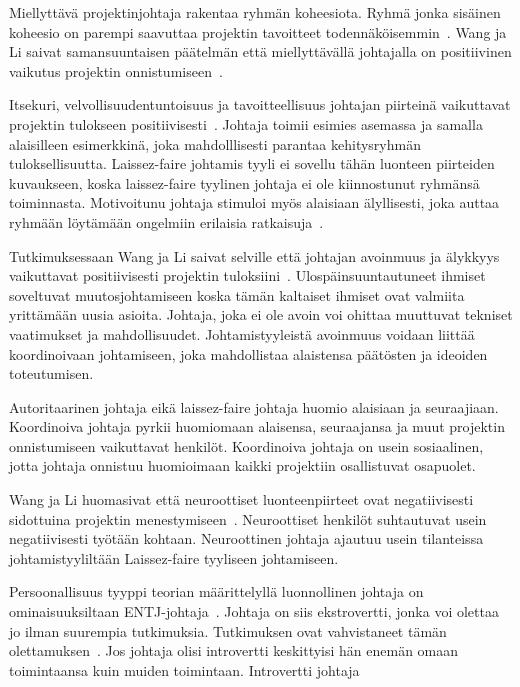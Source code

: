\documentclass[finnish]{tktltiki2}
\theoremstyle{definition}
\theoremstyle{remark}
\begin{document}
Miellyttävä projektinjohtaja rakentaa ryhmän koheesiota. Ryhmä jonka sisäinen koheesio on parempi saavuttaa projektin tavoitteet todennäköisemmin~\cite{bahli2005group}. Wang ja Li saivat samansuuntaisen päätelmän että miellyttävällä johtajalla on positiivinen vaikutus projektin onnistumiseen~\cite{Wang:2009:PMP:1639950.1640049}.

Itsekuri, velvollisuudentuntoisuus ja tavoitteellisuus johtajan piirteinä vaikuttavat projektin tulokseen positiivisesti~\cite{Wang:2009:PMP:1639950.1640049}. Johtaja toimii esimies asemassa ja samalla alaisilleen esimerkkinä, joka mahdolllisesti parantaa kehitysryhmän tuloksellisuutta. Laissez-faire johtamis tyyli ei sovellu tähän luonteen piirteiden kuvaukseen, koska laissez-faire tyylinen johtaja ei ole kiinnostunut ryhmänsä toiminnasta. Motivoitunu johtaja stimuloi myös alaisiaan älyllisesti, joka auttaa ryhmään löytämään ongelmiin erilaisia ratkaisuja~\cite{thite2000leadership}.

Tutkimuksessaan Wang ja Li saivat selville että johtajan avoinmuus ja älykkyys vaikuttavat positiivisesti  projektin tuloksiini~\cite{Wang:2009:PMP:1639950.1640049}. Ulospäinsuuntautuneet ihmiset soveltuvat muutosjohtamiseen koska tämän kaltaiset ihmiset ovat valmiita yrittämään uusia asioita. Johtaja, joka ei ole avoin voi ohittaa muuttuvat tekniset vaatimukset ja mahdollisuudet. Johtamistyyleistä avoinmuus voidaan liittää koordinoivaan johtamiseen, joka mahdollistaa alaistensa päätösten ja ideoiden toteutumisen.

Autoritaarinen johtaja eikä laissez-faire johtaja huomio alaisiaan ja seuraajiaan. Koordinoiva johtaja pyrkii huomiomaan alaisensa, seuraajansa ja muut projektin onnistumiseen vaikuttavat henkilöt. Koordinoiva johtaja on usein sosiaalinen, jotta johtaja onnistuu huomioimaan kaikki projektiin osallistuvat osapuolet. 

Wang ja Li huomasivat että neuroottiset luonteenpiirteet ovat negatiivisesti sidottuina projektin menestymiseen~\cite{Wang:2009:PMP:1639950.1640049}. Neuroottiset henkilöt suhtautuvat usein negatiivisesti työtään kohtaan. Neuroottinen johtaja ajautuu usein tilanteissa johtamistyyliltään Laissez-faire tyyliseen johtamiseen.

Persoonallisuus tyyppi teorian määrittelyllä luonnollinen johtaja on ominaisuuksiltaan ENTJ-johtaja~\cite{bradley1997effect}. Johtaja on siis ekstrovertti, jonka voi olettaa jo ilman suurempia tutkimuksia. Tutkimuksen ovat vahvistaneet tämän olettamuksen~\cite{bradley1997effect}. Jos johtaja olisi introvertti keskittyisi hän enemän omaan toimintaansa kuin muiden toimintaan. Introvertti johtaja   
\end{document}
